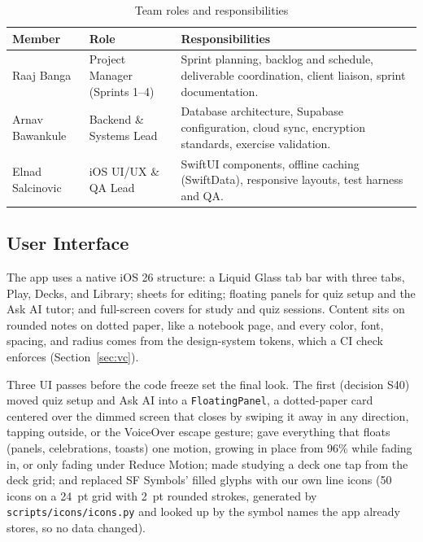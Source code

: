 \documentclass[12pt,letterpaper]{article}
\begin{document}
\begin{table}[H]
\centering
\caption{Team roles and responsibilities}
\label{tab:team}
\begin{tabularx}{\textwidth}{@{}L{3.1cm} L{3.3cm} Y@{}}
\toprule
\textbf{Member} & \textbf{Role} & \textbf{Responsibilities} \\
\midrule
Raaj Banga & Project Manager (Sprints 1--4) & Sprint planning, backlog and schedule, deliverable coordination, client liaison, sprint documentation. \\
Arnav Bawankule & Backend \& Systems Lead & Database architecture, Supabase configuration, cloud sync, encryption standards, exercise validation. \\
Elnad Salcinovic & iOS UI/UX \& QA Lead & SwiftUI components, offline caching (SwiftData), responsive layouts, test harness and QA. \\
\bottomrule
\end{tabularx}
\end{table}

\subsection{User Interface}\label{sec:ui}
The app uses a native iOS 26 structure: a Liquid Glass tab bar with three tabs, Play,
Decks, and Library; sheets for editing; floating panels for quiz setup and the Ask AI tutor; and
full-screen covers for study and quiz sessions. Content sits on rounded notes on dotted
paper, like a notebook page, and every color, font, spacing, and radius comes from the
design-system tokens, which a CI check enforces (Section~\ref{sec:vc}).

Three UI passes before the code freeze set the final look. The first (decision S40)
moved quiz setup and Ask AI into a \texttt{FloatingPanel}, a dotted-paper card
centered over the dimmed screen that closes by swiping it away in any direction,
tapping outside, or the VoiceOver escape gesture; gave everything that floats (panels,
celebrations, toasts) one motion, growing in place from 96\% while fading in, or only
fading under Reduce Motion; made studying a deck one tap from the deck grid; and
replaced SF Symbols' filled glyphs with our own line icons (50 icons on a 24~pt grid
with 2~pt rounded strokes, generated by \texttt{scripts/icons/icons.py} and looked up
by the symbol names the app already stores, so no data changed).
\end{document}
